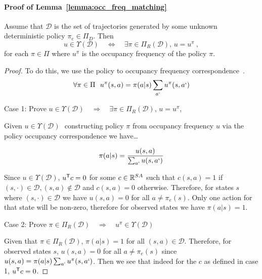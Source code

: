 \documentclass[11pt]{article}
\begin{document}
\paragraph{Proof of Lemma~\ref{lemma:occ_freq_matching}}
Assume that $\mathcal{D}$ is the set of trajectories generated by some unknown deterministic policy $\pi_e \in \Pi_D$. Then
\[
	u \in \Upsilon (\mathcal{D})  \quad \Leftrightarrow \quad  \exists \pi \in \Pi_R(\mathcal{D}), \, u = u^{\pi}~,
\]
for each $\pi \in \Pi$ where $u^{\pi}$ is the occupancy frequency of the policy $\pi$.
\begin{proof}
	To do this, we use the policy to occupancy frequency correspondence~\cite{Puterman1994}.
	\[\forall \pi \in \Pi \,\,\,\, u^\pi(s,a) = \pi(a|s)\sum_{a`}{u^\pi(s,a`)}\]

	Case 1: Prove $u \in \Upsilon (\mathcal{D})  \quad \Rightarrow \quad  \exists
		\pi \in \Pi_R(\mathcal{D}), \, u = u^{\pi}$,

	Given $u \in \Upsilon (\mathcal{D})\,\,$ constructing policy $\pi$ from
	occupancy frequency $u$ via the policy occupancy correspondence we have\dots

	\[\pi(a|s) = \frac{u(s,a)}{\sum_{a`}u(s,a`)}\]

	Since $u \in \Upsilon (\mathcal{D})$, $u^{\mathsf{T}} c = 0$ for some $c \in \mathbb{R}^{SA}$ such that
	$c(s,a) = 1$ if $(s,\cdot) \in \mathcal{D}, (s,a) \notin \mathcal{D}$ and $c(s,a) = 0$ otherwise.
	Therefore, for states $s$ where $(s,\cdot) \in \mathcal{D}$ we have $u(s,a) = 0$ for all $a \not= \pi_e(s)$.
	Only one action for that state will be non-zero, therefore for observed states we have $\pi(a|s) = 1$.

	Case 2: Prove $\pi \in \Pi_R(\mathcal{D}) \quad \Rightarrow \quad  u^\pi \in
		\Upsilon (\mathcal{D})$

	Given that $\pi \in \Pi_R(\mathcal{D})$, $\pi(a|s) = 1$ for all $(s,a) \in \mathcal{D}$. Therefore, for observed states $s$, $u(s,a) = 0$ for all $a \not= \pi_e(s)$
	since $u(s,a) = \pi(a|s)\sum_{a`}{u^\pi(s,a`)}$. Then we see that indeed for the $c$ as defined in case 1, $u^{\mathsf{T}} c = 0$.
\end{proof}
\end{document}
